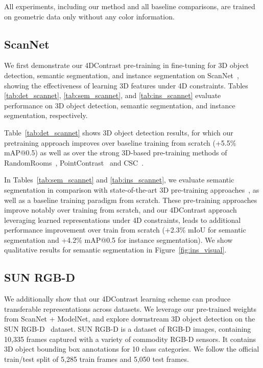 \documentclass[runningheads]{llncs}
\newcommand{\OURS}{4DContrast}
\begin{document}
All experiments, including our method and all baseline comparisons, are trained on geometric data only without any color information.

\subsection{ScanNet}
\label{results:scannet}

We first demonstrate our \OURS{} pre-training in fine-tuning for 3D object detection, semantic segmentation, and instance segmentation on ScanNet~\cite{dai2017scannet}, showing the effectiveness of learning 3D features under 4D constraints.
Tables \ref{tab:det_scannet}, \ref{tab:sem_scannet}, and \ref{tab:ins_scannet} evaluate performance on 3D object detection, semantic segmentation, and instance segmentation, respectively.

Table~\ref{tab:det_scannet} shows 3D object detection results, for which our pretraining approach improves over baseline training from scratch (+5.5\% mAP@0.5) as well as over the strong 3D-based pre-training methods of RandomRooms~\cite{rao2021randomrooms}, PointContrast~\cite{xie2020pointcontrast} and CSC~\cite{hou2021exploring}.

In Tables~\ref{tab:sem_scannet} and \ref{tab:ins_scannet}, we evaluate semantic segmentation in comparison with state-of-the-art 3D pre-training approaches~\cite{hou2021exploring,xie2020pointcontrast}, as well as a baseline training paradigm from scratch.
These pre-training approaches improve notably over training from scratch, and our \OURS{} approach leveraging learned representations under 4D constraints, leads to additional performance improvement over train from scratch (+2.3\% mIoU for semantic segmentation and +4.2\% mAP@0.5 for instance segmentation).
We show qualitative results for semantic segmentation in Figure~\ref{fig:ins_visual}. 

\subsection{SUN RGB-D}
\label{results:sunrgbd}
We additionally show that our \OURS{} learning scheme can produce transferable representations across datasets.
We leverage our pre-trained weights from ScanNet + ModelNet, and explore downstream 3D object detection on the SUN RGB-D~\cite{song2015sun} dataset.
SUN RGB-D is a dataset of RGB-D images, containing 10,335 frames captured with a variety of commodity \mbox{RGB-D} sensors.
It contains 3D object bounding box annotations for 10 class categories. We follow the official train/test split of 5,285 train frames and 5,050 test frames.
\end{document}
